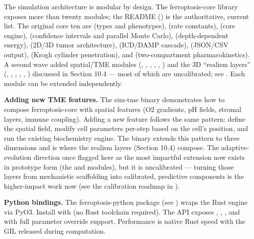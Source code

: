 \documentclass[11pt,twoside,openright]{report}
\begin{document}
The simulation architecture is modular by design. The ferroptosis-core library exposes more than twenty modules; the README () is the authoritative, current list. The original core ten are  (types and phenotypes),  (rate constants),  (core engine),  (confidence intervals and parallel Monte Carlo),  (depth-dependent energy),  (2D/3D tumor architecture),  (ICD/DAMP cascade),  (JSON/CSV output),  (Krogh cylinder penetration), and  (two-compartment pharmacokinetics). A second wave added spatial/TME modules (, , , , , ) and the 3D ``realism layers'' (, , , , , ) discussed in Section 10.4 --- most of which are uncalibrated; see . Each module can be extended independently.

\textbf{Adding new TME features.} The sim-tme binary demonstrates how to compose ferroptosis-core with spatial features (O2 gradients, pH fields, stromal layers, immune coupling). Adding a new feature follows the same pattern: define the spatial field, modify cell parameters per-step based on the cell's position, and run the existing biochemistry engine. The  binary extends this pattern to three dimensions and is where the realism layers (Section 10.4) compose. The adaptive-evolution direction once flagged here as the most impactful extension now exists in prototype form (the  and  modules), but it is uncalibrated --- turning those layers from mechanistic scaffolding into calibrated, predictive components is the higher-impact work now (see the calibration roadmap in ).

\textbf{Python bindings.} The ferroptosis-python package (see ) wraps the Rust engine via PyO3. Install with  (no Rust toolchain required). The API exposes , , , and  with full parameter override support. Performance is native Rust speed with the GIL released during computation.
\end{document}
